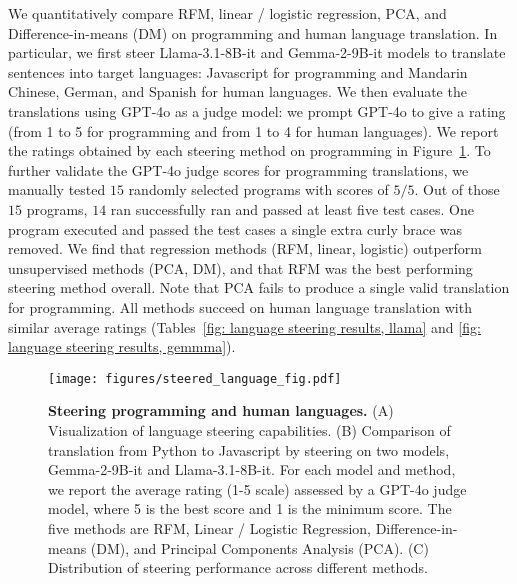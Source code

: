 We quantitatively compare RFM, linear / logistic regression, PCA, and Difference-in-means (DM) on programming and human language translation. In particular, we first steer Llama-3.1-8B-it and Gemma-2-9B-it models to translate sentences into target languages: Javascript for programming and Mandarin Chinese, German, and Spanish for human languages. We then evaluate the translations using GPT-4o as a judge model: we prompt GPT-4o to give a rating (from 1 to 5 for programming and from 1 to 4 for human languages). We report the ratings obtained by each steering method on programming in Figure~\ref{fig: full language steering results}. 
To further validate the GPT-4o judge scores for programming translations, we manually tested $15$ randomly selected programs with scores of $5/5$. Out of those $15$ programs, $14$ ran  successfully ran and passed at least five test cases. One program executed and passed the test cases  a single extra curly brace was removed. We find that regression methods (RFM, linear, logistic) outperform unsupervised methods (PCA, DM), and that RFM was the best performing steering method overall. Note that PCA fails to produce a single valid translation for programming. All methods succeed on human language translation with similar average ratings (Tables~\ref{fig: language steering results, llama} and \ref{fig: language steering results, gemmma}).

\begin{figure}[t]
    \centering
    \texttt{[image: figures/steered\_language\_fig.pdf]}    
    \caption{\textbf{Steering programming and human languages.} (A) Visualization of language steering capabilities. (B) Comparison of translation from Python to Javascript by steering on two models, Gemma-2-9B-it and Llama-3.1-8B-it.  For each model and method, we report the average rating (1-5 scale) assessed by a GPT-4o judge model, where 5 is the best score and 1 is the minimum score. The five methods are RFM, Linear / Logistic Regression, Difference-in-means (DM), and Principal Components Analysis (PCA). (C) Distribution of steering performance across different methods.}
    \label{fig: full language steering results}
\end{figure}

